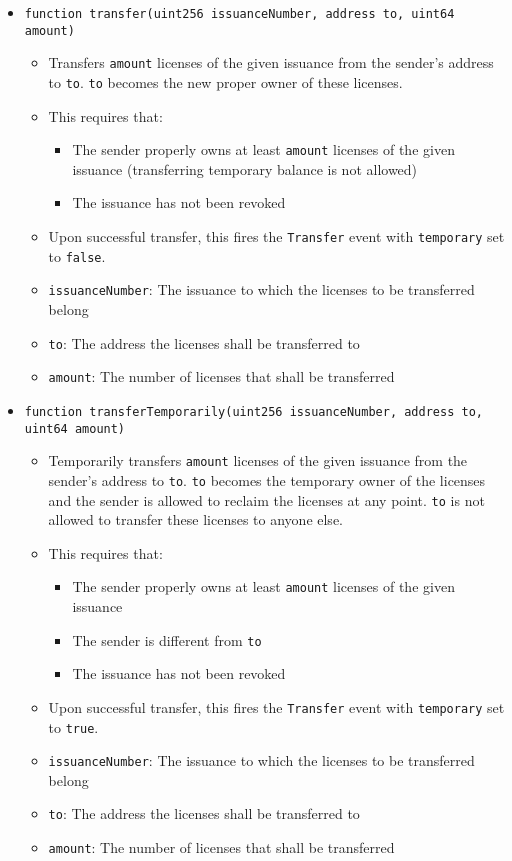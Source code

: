 \documentclass[a4paper]{article}
\begin{document}
\begin{itemize}
  \item \texttt{function transfer(uint256 issuanceNumber, address to, uint64 amount)}
  \begin{itemize}
    \item Transfers \texttt{amount} licenses of the given issuance from the sender's address to \texttt{to}. \texttt{to} becomes the new proper owner of these licenses.
    \item This requires that:
    \begin{itemize}
      \item The sender properly owns at least \texttt{amount} licenses of the given issuance (transferring temporary balance is not allowed)
      \item The issuance has not been revoked
    \end{itemize}
    \item Upon successful transfer, this fires the \texttt{Transfer} event with \texttt{temporary} set to \texttt{false}.
    \item \texttt{issuanceNumber}: The issuance to which the licenses to be transferred belong
    \item \texttt{to}: The address the licenses shall be transferred to
    \item \texttt{amount}: The number of licenses that shall be transferred
  \end{itemize}
  
  \item \texttt{function transferTemporarily(uint256 issuanceNumber, address to, uint64 amount)}
  \begin{itemize}
    \item Temporarily transfers \texttt{amount} licenses of the given issuance from the sender's address to \texttt{to}. \texttt{to} becomes the temporary owner of the licenses and the sender is allowed to reclaim the licenses at any point. \texttt{to} is not allowed to transfer these licenses to anyone else.
    \item This requires that:
    \begin{itemize}
      \item The sender properly owns at least \texttt{amount} licenses of the given issuance
      \item The sender is different from \texttt{to}
      \item The issuance has not been revoked
    \end{itemize}
    \item Upon successful transfer, this fires the \texttt{Transfer} event with \texttt{temporary} set to \texttt{true}.
    \item \texttt{issuanceNumber}: The issuance to which the licenses to be transferred belong
    \item \texttt{to}: The address the licenses shall be transferred to
    \item \texttt{amount}: The number of licenses that shall be transferred
  \end{itemize}
  

\end{itemize}
\end{document}
